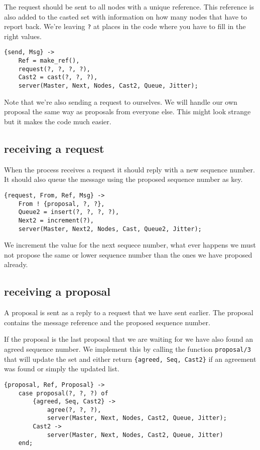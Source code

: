 \documentclass[a4paper,11pt]{article}
\begin{document}
The request should be sent to all nodes with a unique reference.  This
reference is also added to the casted set with information on how many
nodes that have to report back. We're leaving {\tt ?} at
places in the code where you have to fill in the right values.

\begin{verbatim}
{send, Msg} ->
    Ref = make_ref(),
    request(?, ?, ?, ?),
    Cast2 = cast(?, ?, ?),
    server(Master, Next, Nodes, Cast2, Queue, Jitter);
\end{verbatim}

Note that we're also sending a request to ourselves. We will handle our
own proposal the same way as proposals from everyone else. This might
look strange but it makes the code much easier.

\subsection{receiving a request}

When the process receives a request it should reply with a new
sequence number. It should also queue the message using the proposed
sequence number as key.

\begin{verbatim}
{request, From, Ref, Msg} ->
    From ! {proposal, ?, ?},
    Queue2 = insert(?, ?, ?, ?),
    Next2 = increment(?),
    server(Master, Next2, Nodes, Cast, Queue2, Jitter);
\end{verbatim}

We increment the value for the next sequece number, what ever happens
we must not propose the same or lower sequence number than the ones we
have proposed already.

\subsection{receiving a proposal}

A proposal is sent as a reply to a request that we have sent
earlier. The proposal contains the message reference and the proposed
sequence number. 

If the proposal is the last proposal that we are waiting for we have
also found an agreed sequence number. We implement this by calling the
function {\tt proposal/3} that will update the set and either return
{\tt\{agreed, Seq, Cast2\}} if an agreement was found or simply the
updated list.

\begin{verbatim}
{proposal, Ref, Proposal} ->
    case proposal(?, ?, ?) of
        {agreed, Seq, Cast2} ->
            agree(?, ?, ?),
            server(Master, Next, Nodes, Cast2, Queue, Jitter); 
        Cast2 ->
            server(Master, Next, Nodes, Cast2, Queue, Jitter)
    end;
\end{verbatim}
\end{document}
